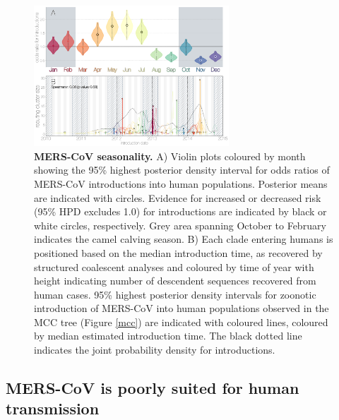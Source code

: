 \documentclass[11pt,oneside,letterpaper]{article}
\def\lmc#1{\textcolor{green}{[#1]}}
\begin{document}
\begin{figure}[h]
\centering
	\includegraphics[width=0.65\textwidth]{figures/mers_seasonality.png}
	\caption{\textbf{MERS-CoV seasonality.}
A) Violin plots coloured by month showing the 95\% highest posterior density interval for odds ratios of MERS-CoV introductions into human populations.
Posterior means are indicated with circles.
Evidence for increased or decreased risk (95\% HPD excludes 1.0) for introductions are indicated by black or white circles, respectively.
Grey area spanning October to February indicates the camel calving season.
B) Each clade entering humans is positioned based on the median introduction time, as recovered by structured coalescent analyses and coloured by time of year with height indicating number of descendent sequences recovered from human cases.
95\% highest posterior density intervals for zoonotic introduction of MERS-CoV into human populations observed in the MCC tree (Figure \ref{mcc}) are indicated with coloured lines, coloured by median estimated introduction time.
The black dotted line indicates the joint probability density for introductions.
	}
	\label{seasonality}
\end{figure}

%

\subsection*{MERS-CoV is poorly suited for human transmission}
\end{document}
